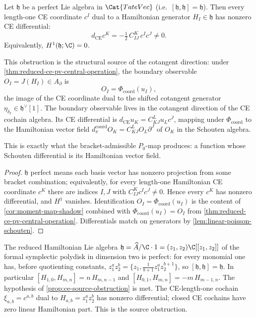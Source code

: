\documentclass[11pt]{memoir}
\begin{document}
\begin{prop}\label{prop:ce-source-obstruction}
  Let $\mathfrak h$ be a perfect Lie algebra in $\Cat{TateVec}$
  (i.e.\ $[\mathfrak h,\mathfrak h]=\mathfrak h$). Then every
  length-one CE coordinate $c^I$ dual to a Hamiltonian generator
  $H_I\in\mathfrak h$ has nonzero CE differential:
  $$d_{\mathrm{CE}}c^K=-\tfrac12\,C^K_{IJ}\,c^Ic^J\neq 0.$$
  Equivalently, $H^1(\mathfrak h;\C)=0$.

  This obstruction is the structural source of the cotangent direction:
	  under \ref{thm:reduced-ce-pv-central-operation}, the boundary
	  observable $O_I=J(H_I)\in A_\partial$ is
	  $$O_I=\Phi_{\mathrm{coord}}(u_I),$$
  the image of the CE coordinate dual to the shifted cotangent generator
  $\eta_{\delta_I}\in\mathfrak h^\vee[1]$. The boundary observable lives
  in the cotangent direction of the CE cochain algebra. Its CE differential is
	  $d_{\mathrm{CE}}u_K=C^L_{KJ}u_Lc^J$, mapping under
	  \(\Phi_{\mathrm{coord}}\) to the
	  Hamiltonian vector field
	  \(d_\pi^{\mathrm{coord}}O_K=C^L_{KJ}O_L\partial^J\) of \(O_K\) in
  the Schouten algebra.

	  This is exactly what the bracket-admissible \(P_0\)-map produces: a
	  function whose Schouten differential is its Hamiltonian vector field.
\end{prop}

\begin{proof}
  $\mathfrak h$ perfect means each basis vector has nonzero projection
  from some bracket combination; equivalently, for every length-one
  Hamiltonian CE coordinate \(c^K\) there are indices \(I,J\) with
  \(C^K_{IJ}c^Ic^J\neq0\). Hence every \(c^K\) has nonzero
  differential, and \(H^1\) vanishes.
	  Identification \(O_I=\Phi_{\mathrm{coord}}(u_I)\) is the content of
	  \ref{cor:moment-map-shadow} combined with
	  \(\Phi_{\mathrm{coord}}(u_I)=O_I\) from
  \ref{thm:reduced-ce-pv-central-operation}. Differentials match on
  generators by \ref{lem:linear-poisson-schouten}.
\end{proof}

\begin{rmk}\label{rmk:ce-source-obstruction-disk}
  The reduced Hamiltonian Lie algebra
  $\mathfrak h=\widehat A/\C\cdot 1=(z_1,z_2)\C[[z_1,z_2]]$ of the
  formal symplectic polydisk in dimension two is perfect: for every
  monomial one has, before quotienting constants,
  $z_1^az_2^b=\bigl\{z_1,\tfrac{1}{b+1}z_1^az_2^{b+1}\bigr\}$, so
  $[\mathfrak h,\mathfrak h]=\mathfrak h$. In particular
  $[H_{1,0},H_{m,n}]=n\,H_{m,n-1}$ and
  $[H_{0,1},H_{m,n}]=-m\,H_{m-1,n}$. The hypothesis of
  \ref{prop:ce-source-obstruction} is met. The CE-length-one cochain
  $\xi_{a,b}=c^{a,b}$ dual to $H_{a,b}=z_1^az_2^b$ has nonzero
  differential; closed CE cochains have zero linear Hamiltonian part.
  This is the source obstruction.
\end{rmk}
\end{document}
